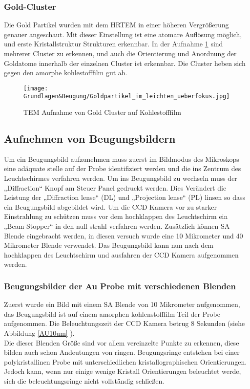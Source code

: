 \subsubsection{Gold-Cluster}
Die Gold Partikel wurden mit dem HRTEM in einer höheren Vergrößerung genauer angeschaut. Mit dieser Einstellung ist eine atomare Auflösung möglich, und erste Kristallstruktur Strukturen erkennbar. In der Aufnahme \cref{TEMGoldcluster} sind mehrerer Cluster zu erkennen, und auch die Orientierung und Anordnung der Goldatome innerhalb der einzelnen Cluster ist erkennbar. Die Cluster heben sich gegen den amorphe kohlestofffilm gut ab.

\begin{figure}[htbp]
 \centering
 \texttt{[image: Grundlagen\&Beugung/Goldpartikel\_im\_leichten\_ueberfokus.jpg]}
 \caption[TEM Gold cluster]{TEM Aufnahme von Gold Cluster auf Kohlestofffilm}
 \label{TEMGoldcluster}
\end{figure}

\subsection{Aufnehmen von Beugungsbildern}
Um ein Beugungsbild aufzunehmen muss zuerst im Bildmodus des Mikroskops eine adäquate stelle auf der Probe identifiziert werden und die ins Zentrum des Leuchtschirmes verfahren werden. Um ins Beugungsbild zu wechseln muss der „Diffraction“ Knopf am Steuer Panel gedruckt werden. Dies Verändert die Leistung der „Diffraction lense“ (DL) und „Projection lense“ (PL) linsen so dass ein Beugungsbild abgebildet wird. Um die CCD Kamera vor zu starker Einstrahlung zu schützen muss vor dem hochklappen des Leuchtschirm ein „Beam Stopper“ in den null strahl verfahren werden. Zusätzlich können SA Blende eingebracht werden, in diesen versuch wurde eine 10 Mikrometer und 40 Mikrometer Blende verwendet. Das Beugungsbild kann nun nach dem hochklappen des Leuchtschirm und ausfahren der CCD Kamera aufgenommen werden.

\subsubsection{Beugungsbilder der Au Probe mit verschiedenen Blenden}

Zuerst wurde ein Bild mit einem SA Blende von 10 Mikrometer aufgenommen, das Beugungsbild ist auf einem amorphen kohlenstofffilm Teil der Probe aufgenommen. Die Beleuchtungszeit der CCD Kamera betrug 8 Sekunden (siehe Abbildung \cref{AU10um} ).\\
Die dieser Blenden Größe sind vor allem vereinzelte Punkte zu erkennen, diese bilden auch schon Andeutungen von ringen. Beugungsringe entstehen bei einer polykristallinen Probe mit unterschiedlichen kristallographischen Orientierungen. Jedoch kann, wenn nur einige wenige Kristall Orientierungen beleuchtet werde, sich die beleuchtungsringe nicht vollständig schließen.

